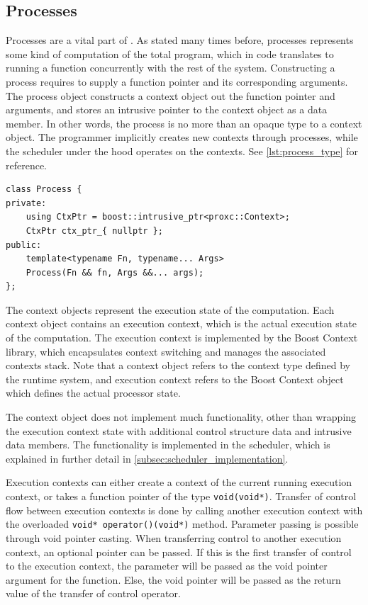 \subsection{Processes}
\label{subsec:process_implementation}


Processes are a vital part of \Proxc{}. As stated many times before, processes represents some kind of computation of the total program, which in code translates to running a function concurrently with the rest of the system. Constructing a process requires to supply a function pointer and its corresponding arguments. The process object constructs a context object out the function pointer and arguments, and stores an intrusive pointer to the context object as a data member. In other words, the process is no more than an opaque type to a context object. The programmer implicitly creates new contexts through processes, while the scheduler under the hood operates on the contexts. See \cref{lst:process_type} for reference.

\begin{lstfloat}
\begin{lstlisting}[caption={Minimal process type.}, label={lst:process_type}, style={CustomC++}, xleftmargin={2em}]
class Process {
private:
    using CtxPtr = boost::intrusive_ptr<proxc::Context>;
    CtxPtr ctx_ptr_{ nullptr };
public:
    template<typename Fn, typename... Args>
    Process(Fn && fn, Args &&... args);
};
\end{lstlisting}
\end{lstfloat}

The context objects represent the execution state of the computation. Each context object contains an execution context, which is the actual execution state of the computation. The execution context is implemented by the Boost Context library, which encapsulates context switching and manages the associated contexts stack. Note that a context object refers to the context type defined by the runtime system, and execution context refers to the Boost Context object which defines the actual processor state.

The context object does not implement much functionality, other than wrapping the execution context state with additional control structure data and intrusive data members. The functionality is implemented in the scheduler, which is explained in further detail in \cref{subsec:scheduler_implementation}.

Execution contexts can either create a context of the current running execution context, or takes a function pointer of the type \lstinline[style={CustomC++}]|void(void*)|. Transfer of control flow between execution contexts is done by calling another execution context with the overloaded \lstinline[style={CustomC++}]|void* operator()(void*)| method. Parameter passing is possible through void pointer casting. When transferring control to another execution context, an optional pointer can be passed. If this is the first transfer of control to the execution context, the parameter will be passed as the void pointer argument for the function. Else, the void pointer will be passed as the return value of the transfer of control operator.

